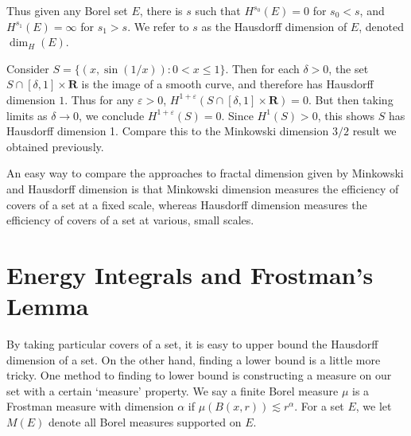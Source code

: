 Thus given any Borel set $E$, there is $s$ such that $H^{s_0}(E) = 0$ for $s_0 < s$, and $H^{s_1}(E) = \infty$ for $s_1 > s$. We refer to $s$ as the Hausdorff dimension of $E$, denoted $\dim_H(E)$.

\begin{example}
	Consider $S = \{ (x,\sin(1/x)) : 0 < x \leq 1 \}$. Then for each $\delta > 0$, the set $S \cap [\delta,1] \times \mathbf{R}$ is the image of a smooth curve, and therefore has Hausdorff dimension $1$. Thus for any $\varepsilon > 0$, $H^{1 + \varepsilon}(S \cap [\delta,1] \times \mathbf{R}) = 0$. But then taking limits as $\delta \to 0$, we conclude $H^{1+\varepsilon}(S) = 0$. Since $H^1(S) > 0$, this shows $S$ has Hausdorff dimension 1. Compare this to the Minkowski dimension $3/2$ result we obtained previously.
\end{example}

An easy way to compare the approaches to fractal dimension given by Minkowski and Hausdorff dimension is that Minkowski dimension measures the efficiency of covers of a set at a fixed scale, whereas Hausdorff dimension measures the efficiency of covers of a set at various, small scales.

\section{Energy Integrals and Frostman's Lemma}

By taking particular covers of a set, it is easy to upper bound the Hausdorff dimension of a set. On the other hand, finding a lower bound is a little more tricky. One method to finding to lower bound is constructing a measure on our set with a certain `measure' property. We say a finite Borel measure $\mu$ is a Frostman measure with dimension $\alpha$ if $\mu(B(x,r)) \lesssim r^\alpha$. For a set $E$, we let $M(E)$ denote all Borel measures supported on $E$.

